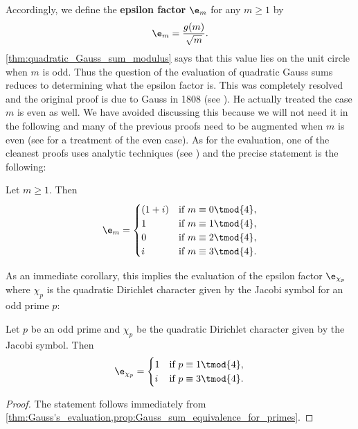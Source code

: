        Accordingly, we define the \textbf{epsilon factor} $\e_{m}$ for any $m \ge 1$ by
        \[
          \e_{m} = \frac{g(m)}{\sqrt{m}}.
        \]
        \cref{thm:quadratic_Gauss_sum_modulus} says that this value lies on the unit circle when $m$ is odd. Thus the question of the evaluation of quadratic Gauss sums reduces to determining what the epsilon factor is. This was completely resolved and the original proof is due to Gauss in 1808 (see \cite{Gauss1808summatio}). He actually treated the case $m$ is even as well. We have avoided discussing this because we will not need it in the following and many of the previous proofs need to be augmented when $m$ is even (see \cite{lang1994algebraic} for a treatment of the even case). As for the evaluation, one of the cleanest proofs uses analytic techniques (see \cite{lang1994algebraic}) and the precise statement is the following:

        \begin{theorem}\label{thm:Gauss's_evaluation}
          Let $m \ge 1$. Then
          \[
            \e_{m} = \begin{cases} (1+i) & \text{if $m \equiv 0 \tmod{4}$}, \\ 1 & \text{if $m \equiv 1 \tmod{4}$}, \\ 0 & \text{if $m \equiv 2 \tmod{4}$}, \\ i & \text{if $m \equiv 3 \tmod{4}$}. \end{cases}
          \]
        \end{theorem}

        As an immediate corollary, this implies the evaluation of the epsilon factor $\e_{\chi_{p}}$ where $\chi_{p}$ is the quadratic Dirichlet character given by the Jacobi symbol for an odd prime $p$:

        \begin{corollary}
          Let $p$ be an odd prime and $\chi_{p}$ be the quadratic Dirichlet character given by the Jacobi symbol. Then
          \[
            \e_{\chi_{p}} = \begin{cases} 1 & \text{if $p \equiv 1 \tmod{4}$}, \\ i & \text{if $p \equiv 3 \tmod{4}$}. \end{cases}
          \]
        \end{corollary}
        \begin{proof}
          The statement follows immediately from \cref{thm:Gauss's_evaluation,prop:Gauss_sum_equivalence_for_primes}.
        \end{proof}
